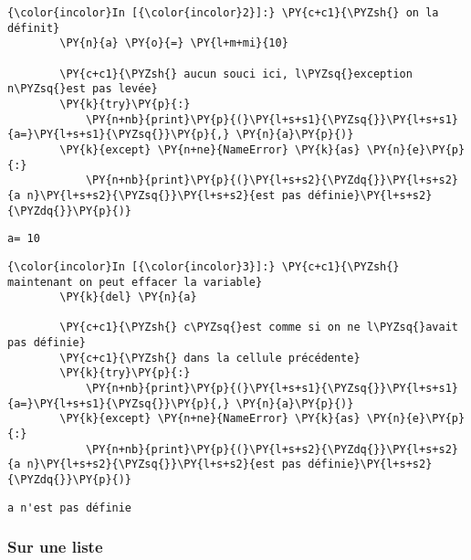     \begin{Verbatim}[commandchars=\\\{\}]
{\color{incolor}In [{\color{incolor}2}]:} \PY{c+c1}{\PYZsh{} on la définit}
        \PY{n}{a} \PY{o}{=} \PY{l+m+mi}{10}
        
        \PY{c+c1}{\PYZsh{} aucun souci ici, l\PYZsq{}exception n\PYZsq{}est pas levée}
        \PY{k}{try}\PY{p}{:}
            \PY{n+nb}{print}\PY{p}{(}\PY{l+s+s1}{\PYZsq{}}\PY{l+s+s1}{a=}\PY{l+s+s1}{\PYZsq{}}\PY{p}{,} \PY{n}{a}\PY{p}{)}
        \PY{k}{except} \PY{n+ne}{NameError} \PY{k}{as} \PY{n}{e}\PY{p}{:}
            \PY{n+nb}{print}\PY{p}{(}\PY{l+s+s2}{\PYZdq{}}\PY{l+s+s2}{a n}\PY{l+s+s2}{\PYZsq{}}\PY{l+s+s2}{est pas définie}\PY{l+s+s2}{\PYZdq{}}\PY{p}{)}
\end{Verbatim}


    \begin{Verbatim}[commandchars=\\\{\}]
a= 10

    \end{Verbatim}

    \begin{Verbatim}[commandchars=\\\{\}]
{\color{incolor}In [{\color{incolor}3}]:} \PY{c+c1}{\PYZsh{} maintenant on peut effacer la variable}
        \PY{k}{del} \PY{n}{a}
        
        \PY{c+c1}{\PYZsh{} c\PYZsq{}est comme si on ne l\PYZsq{}avait pas définie}
        \PY{c+c1}{\PYZsh{} dans la cellule précédente}
        \PY{k}{try}\PY{p}{:}
            \PY{n+nb}{print}\PY{p}{(}\PY{l+s+s1}{\PYZsq{}}\PY{l+s+s1}{a=}\PY{l+s+s1}{\PYZsq{}}\PY{p}{,} \PY{n}{a}\PY{p}{)}
        \PY{k}{except} \PY{n+ne}{NameError} \PY{k}{as} \PY{n}{e}\PY{p}{:}
            \PY{n+nb}{print}\PY{p}{(}\PY{l+s+s2}{\PYZdq{}}\PY{l+s+s2}{a n}\PY{l+s+s2}{\PYZsq{}}\PY{l+s+s2}{est pas définie}\PY{l+s+s2}{\PYZdq{}}\PY{p}{)}
\end{Verbatim}


    \begin{Verbatim}[commandchars=\\\{\}]
a n'est pas définie

    \end{Verbatim}

    \hypertarget{sur-une-liste}{%
\subsubsection{Sur une liste}\label{sur-une-liste}}

